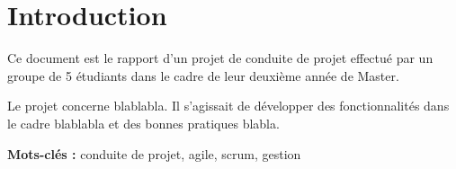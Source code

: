 \chapter{Introduction}

Ce document est le rapport d'un projet de conduite de projet effectué par un groupe de 5 étudiants dans le cadre de leur deuxième année de Master.

Le projet concerne blablabla. Il s'agissait de développer des fonctionnalités dans le cadre blablabla et des bonnes pratiques blabla.

\vfill

\textbf{Mots-clés :} conduite de projet, agile, scrum, gestion

\vfill

